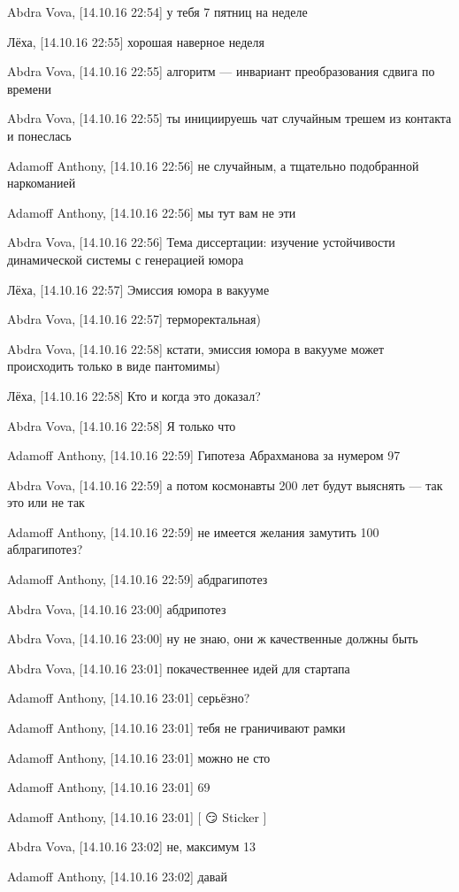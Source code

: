 Abdra Vova, [14.10.16 22:54]
у тебя 7 пятниц на неделе

Лёха, [14.10.16 22:55]
хорошая наверное неделя

Abdra Vova, [14.10.16 22:55]
алгоритм — инвариант преобразования сдвига по времени

Abdra Vova, [14.10.16 22:55]
ты инициируешь чат случайным трешем из контакта и понеслась

Adamoff Anthony, [14.10.16 22:56]
не случайным, а тщательно подобранной наркоманией

Adamoff Anthony, [14.10.16 22:56]
мы тут вам не эти

Abdra Vova, [14.10.16 22:56]
Тема диссертации: изучение устойчивости динамической системы с генерацией юмора

Лёха, [14.10.16 22:57]
Эмиссия юмора в вакууме

Abdra Vova, [14.10.16 22:57]
терморектальная)

Abdra Vova, [14.10.16 22:58]
кстати, эмиссия юмора в вакууме может происходить только в виде пантомимы)

Лёха, [14.10.16 22:58]
Кто и когда это доказал?

Abdra Vova, [14.10.16 22:58]
Я только что

Adamoff Anthony, [14.10.16 22:59]
Гипотеза Абрахманова за нумером 97

Abdra Vova, [14.10.16 22:59]
а потом космонавты 200 лет будут выяснять — так это или не так

Adamoff Anthony, [14.10.16 22:59]
не имеется желания замутить 100 аблрагипотез?

Adamoff Anthony, [14.10.16 22:59]
абдрагипотез

Abdra Vova, [14.10.16 23:00]
абдрипотез

Abdra Vova, [14.10.16 23:00]
ну не знаю, они ж качественные должны быть

Abdra Vova, [14.10.16 23:01]
покачественнее идей для стартапа

Adamoff Anthony, [14.10.16 23:01]
серьёзно?

Adamoff Anthony, [14.10.16 23:01]
тебя не граничивают рамки

Adamoff Anthony, [14.10.16 23:01]
можно не сто

Adamoff Anthony, [14.10.16 23:01]
69

Adamoff Anthony, [14.10.16 23:01]
[ 😏 Sticker ]

Abdra Vova, [14.10.16 23:02]
не, максимум 13

Adamoff Anthony, [14.10.16 23:02]
давай

